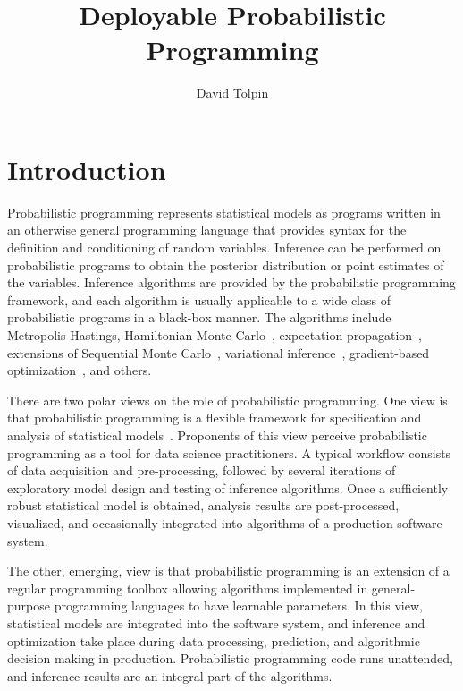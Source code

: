 \documentclass[sigplan,review,10pt,anonymous]{acmart}
\title{Deployable Probabilistic Programming}
\author{David Tolpin}
\affiliation{
    \institution{PUB+}
    \country{Israel}
}
\begin{document}
\maketitle

\begin{sloppypar}

\section{Introduction}

  Probabilistic programming \cite{GMR+08,MSP14,WVM14,GS15}
  represents statistical models as programs written in an
  otherwise general programming language that provides syntax
  for the definition and conditioning of random variables.
  Inference can be performed on probabilistic programs to
  obtain the posterior distribution or point estimates of the
  variables. Inference algorithms are provided by the
  probabilistic programming framework, and each algorithm is
  usually applicable to a wide class of probabilistic programs
  in a black-box manner. The algorithms include
  Metropolis-Hastings\cite{WSG11,MSP14,YHG14}, Hamiltonian
  Monte Carlo~\cite{Stan17}, expectation
  propagation~\cite{MWG+10}, extensions of Sequential Monte
  Carlo~\cite{WVM14,MYM+15,PWD+14,RNL+2016}, variational
  inference~\cite{WW13,KTR+17}, gradient-based
  optimization~\cite{Stan17,BCJ+19}, and others.

  There are two polar views on the role of probabilistic
  programming.  One view is that probabilistic programming is
  a flexible framework for specification and analysis of
  statistical models~\cite{WSG11,TMY+16,GXG18}. Proponents of
  this view perceive probabilistic programming as a tool for
  data science practitioners. A typical workflow consists of
  data acquisition and pre-processing, followed by several
  iterations of exploratory model design and testing of
  inference algorithms. Once a sufficiently robust statistical
  model is obtained, analysis results are post-processed,
  visualized, and occasionally integrated into algorithms of a
  production software system. 

  The other, emerging, view is that probabilistic programming
  is an extension of a regular programming toolbox allowing
  algorithms implemented in general-purpose programming
  languages to have learnable parameters. In this view,
  statistical models are integrated into the software system,
  and inference and optimization take place during data
  processing, prediction, and algorithmic decision making in
  production.  Probabilistic programming code runs unattended,
  and inference results are an integral part of the
  algorithms.


\end{sloppypar}
\end{document}
